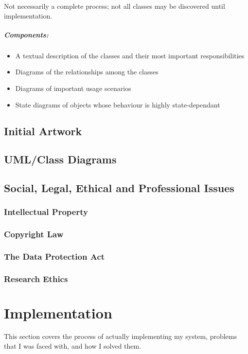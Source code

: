 \documentclass[a4paper,oneside]{report}
\begin{document}
Not necessarily a complete process; not all classes may be discovered until implementation.

\subsubsection{Components:} 
\begin{itemize}
\item A textual description of the classes and their most important responsibilities
\item Diagrams of the relationships among the classes
\item Diagrams of important usage scenarios
\item State diagrams of objects whose behaviour is highly state-dependant
\end{itemize}

\chapter{Initial Artwork}
\chapter{UML/Class Diagrams}
	
\chapter{Social, Legal, Ethical and Professional Issues}
		\section{Intellectual Property}
		\section{Copyright Law}
		\section{The Data Protection Act}
		\section{Research Ethics}

%
%
\part{Implementation}{This section covers the process of actually implementing my system, problems that I was faced with, and how I solved them.}
\end{document}
